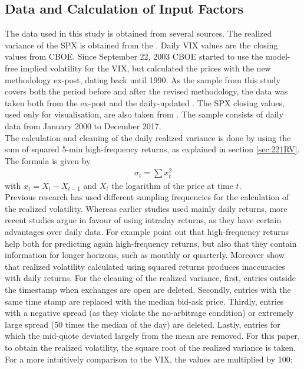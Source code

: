 \subsection{Data and Calculation of Input Factors}\label{sec:41Data}
The data used in this study is obtained from several sources. The realized variance of the \ac{SPX} is obtained from the \textcite{Oxford:RV}. Daily \ac{VIX} values are the closing values from \ac{CBOE}. Since September 22, 2003 \ac{CBOE} started to use the model-free implied volatility for the \ac{VIX}, but calculated the prices with the new methodology ex-post, dating back until 1990. As the sample from this study covers both the period before and after the revised methodology, the data was taken both from the ex-post \textcite{CBOE:old} and the daily-updated \textcite{CBOE:new}. The \ac{SPX} closing values, used only for visualisation, are also taken from \textcite{SandP}. The sample consists of daily data from January 2000 to December 2017. \\
The calculation and cleaning of the daily realized variance is done by \textcite{Oxford:RV} using the sum of squared 5-min high-frequency returns, as explained in section \ref{sec:221RV}. The formula is given by 
\begin{align}
\sigma_{t} = \sum x_{t}^{2}
\end{align}
with $x_{t} = X_{t} - X_{t-1}$ and $X_{t}$ the logarithm of the price at time $t$. \\%
Previous research has used different sampling frequencies for the calculation of the realized volatility. Whereas earlier studies used mainly daily returns, more recent studies argue in favour of using intraday returns, as they have certain advantages over daily data. For example \textcite{andersen2003} point out that high-frequency returns help both for predicting again high-frequency returns, but also that they contain information for longer horizons, such as monthly or quarterly. Moreover \textcite{andersen1998} show that realized volatility calculated using squared returns produces inaccuracies with daily returns. For the cleaning of the realized variance, first, entries outside the timestamp when exchanges are open are deleted. Secondly, entries with the same time stamp are replaced with the median bid-ask price. Thirdly, entries with a negative spread (as they violate the no-arbitrage condition) or extremely large spread (50 times the median of the day) are deleted. Lastly, entries for which the mid-quote deviated largely from the mean are removed. For this paper, to obtain the realized volatility, the square root of the realized variance is taken. For a more intuitively comparison to the \ac{VIX}, the values are multiplied by 100:
